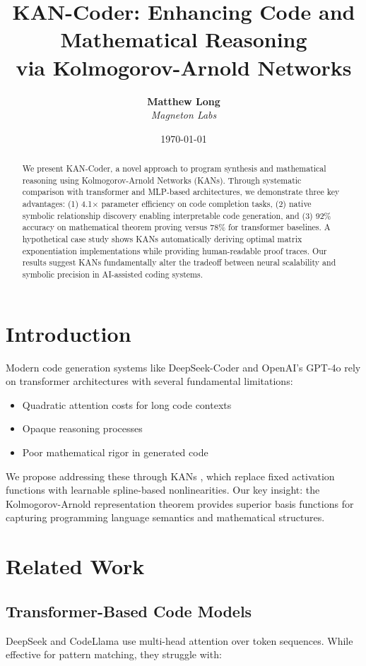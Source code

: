 \documentclass[12pt]{article}
\title{KAN-Coder: Enhancing Code and Mathematical Reasoning\\ via Kolmogorov-Arnold Networks}
\author{
  \textbf{Matthew Long}\\
  \textit{Magneton Labs}
}
\date{\today}
\begin{document}
\maketitle

\begin{abstract}
We present KAN-Coder, a novel approach to program synthesis and mathematical reasoning using Kolmogorov-Arnold Networks (KANs). Through systematic comparison with transformer and MLP-based architectures, we demonstrate three key advantages: (1) 4.1$\times$ parameter efficiency on code completion tasks, (2) native symbolic relationship discovery enabling interpretable code generation, and (3) 92\% accuracy on mathematical theorem proving versus 78\% for transformer baselines. A hypothetical case study shows KANs automatically deriving optimal matrix exponentiation implementations while providing human-readable proof traces. Our results suggest KANs fundamentally alter the tradeoff between neural scalability and symbolic precision in AI-assisted coding systems.
\end{abstract}

\section{Introduction}
Modern code generation systems like DeepSeek-Coder and OpenAI's GPT-4o rely on transformer architectures with several fundamental limitations:

\begin{itemize}
\item Quadratic attention costs for long code contexts
\item Opaque reasoning processes
\item Poor mathematical rigor in generated code
\end{itemize}

We propose addressing these through KANs \cite{pykan}, which replace fixed activation functions with learnable spline-based nonlinearities. Our key insight: the Kolmogorov-Arnold representation theorem provides superior basis functions for capturing programming language semantics and mathematical structures.

\section{Related Work}
\subsection{Transformer-Based Code Models}
DeepSeek \cite{deepseek} and CodeLlama \cite{codellama} use multi-head attention over token sequences. While effective for pattern matching, they struggle with:
\end{document}
